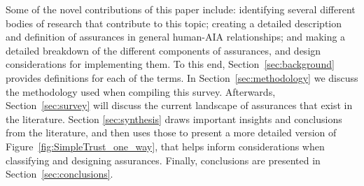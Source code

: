     Some of the novel contributions of this paper include: identifying several different bodies of research that contribute to this topic; creating a detailed description and definition of assurances in general human-AIA relationships; and making a detailed breakdown of the different components of assurances, and design considerations for implementing them. To this end, Section~\ref{sec:background} provides definitions for each of the terms. In Section~\ref{sec:methodology} we discuss the methodology used when compiling this survey. Afterwards, Section~\ref{sec:survey} will discuss the current landscape of assurances that exist in the literature. Section \ref{sec:synthesis} draws important insights and conclusions from the literature, and then uses those to present a more detailed version of Figure~\ref{fig:SimpleTrust_one_way}, that helps inform considerations when classifying and designing assurances. Finally, conclusions are presented in Section~\ref{sec:conclusions}.
